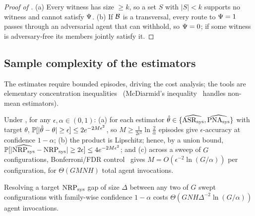 \begin{proof}[Proof of ]
(a) Every witness has size $\ge k$, so a set $S$ with $|S|<k$ supports no witness and
cannot satisfy $\Psi$. (b) If $\mathcal{B}$ is a transversal, every route to
$\Psi=1$ passes through an adversarial agent that can withhold, so $\Psi=0$; if
some witness is adversary-free its members jointly satisfy it.
\end{proof}

\subsection{Sample complexity of the estimators}
\label{sec:theory-sample}
The estimates require bounded episodes, driving the cost analysis; the tools are
elementary concentration inequalities~\cite{boucheron2013concentration} (McDiarmid's
inequality~\cite{mcdiarmid1989bounded} handles non-mean estimators).

\begin{theorem}
\label{thm:sample}
Under , for any $\epsilon,\alpha\in(0,1)$: (a) for each
estimator $\hat\theta\in\{\widehat{\mathrm{ASR}_{\mathrm{sys}}},\widehat{\mathrm{PNA}_{\mathrm{sys}}}\}$ with target $\theta$,
$\mathbb{P}[|\hat\theta-\theta|\ge\epsilon]\le 2e^{-2M\epsilon^{2}}$, so $M\ge\frac{1}{2\epsilon^{2}}
\ln\frac{2}{\alpha}$ episodes give $\epsilon$-accuracy at confidence $1-\alpha$;
(b) the product is Lipschitz; hence, by a union bound, $\mathbb{P}[|\widehat{\mathrm{NRP}_{\mathrm{sys}}}-\mathrm{NRP}_{\mathrm{sys}}|\ge
2\epsilon]\le 4e^{-2M\epsilon^{2}}$;
and (c) across a sweep of $G$ configurations, Bonferroni/FDR control~\cite{benjamini1995controlling}
gives $M=O(\epsilon^{-2}\ln(G/\alpha))$ per configuration, for $\Theta(GMNH)$ total agent
invocations.
\end{theorem}

\begin{corollary}
\label{cor:budget}
Resolving a target $\mathrm{NRP}_{\mathrm{sys}}$ gap of size $\Delta$ between any two of $G$ swept
configurations with family-wise confidence $1-\alpha$ costs
$\Theta(GNH\Delta^{-2}\ln(G/\alpha))$ agent invocations.
\end{corollary}